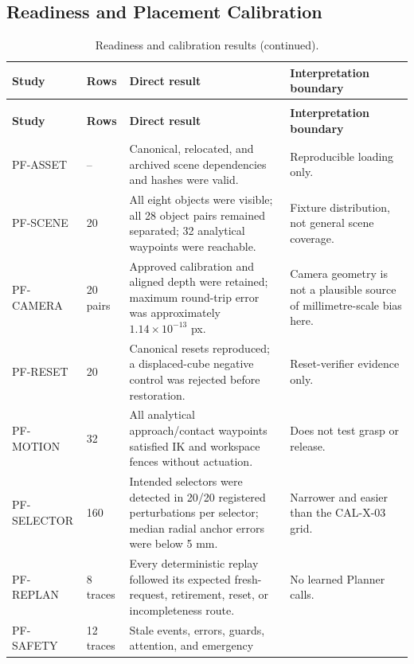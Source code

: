 \documentclass{article}
\begin{document}
\subsection{Readiness and Placement Calibration}

{\footnotesize
\renewcommand{\arraystretch}{1.1}
\begin{longtable}{@{}P{2.25cm}P{1.40cm}P{6.05cm}P{4.95cm}@{}}
    \caption{Readiness and calibration results.}
    \label{tab:app-readiness-calibration} \\
    \toprule
    \textbf{Study} & \textbf{Rows} & \textbf{Direct result} &
    \textbf{Interpretation boundary} \\
    \midrule
    \endfirsthead
    \caption[]{Readiness and calibration results (continued).} \\
    \toprule
    \textbf{Study} & \textbf{Rows} & \textbf{Direct result} &
    \textbf{Interpretation boundary} \\
    \midrule
    \endhead
    \bottomrule
    \endlastfoot
    PF-ASSET & -- & Canonical, relocated, and archived scene dependencies and
    hashes were valid. & Reproducible loading only. \\
    PF-SCENE & 20 & All eight objects were visible; all 28 object pairs remained
    separated; 32 analytical waypoints were reachable. & Fixture distribution,
    not general scene coverage. \\
    PF-CAMERA & 20 pairs & Approved calibration and aligned depth were retained;
    maximum round-trip error was approximately $1.14\times10^{-13}$ px. &
    Camera geometry is not a plausible source of millimetre-scale bias here. \\
    PF-RESET & 20 & Canonical resets reproduced; a displaced-cube negative
    control was rejected before restoration. & Reset-verifier evidence only. \\
    PF-MOTION & 32 & All analytical approach/contact waypoints satisfied IK and
    workspace fences without actuation. & Does not test grasp or release. \\
    PF-SELECTOR & 160 & Intended selectors were detected in 20/20 registered
    perturbations per selector; median radial anchor errors were below 5 mm. &
    Narrower and easier than the CAL-X-03 grid. \\
    PF-REPLAN & 8 traces & Every deterministic replay followed its expected
    fresh-request, retirement, reset, or incompleteness route. & No learned
    Planner calls. \\
    PF-SAFETY & 12 traces & Stale events, errors, guards, attention, and emergency

\end{longtable}}
\end{document}
